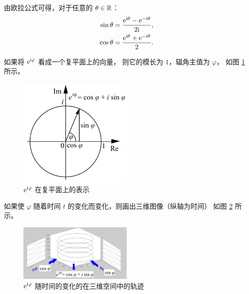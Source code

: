 \begin{corollary}
    由欧拉公式可得，对于任意的 $\theta \in \mathbb{R}$：
    \begin{align*}
        \sin \theta & = \frac{\mathrm{e}^{\mathrm{i}\theta} - \mathrm{e}^{-\mathrm{i}\theta}}{2\mathrm{i}}, \\
        \cos \theta & = \frac{\mathrm{e}^{\mathrm{i}\theta} + \mathrm{e}^{-\mathrm{i}\theta}}{2}.
    \end{align*}
\end{corollary}

\begin{example}[复值信号的图示]
    如果将 $\mathrm{e}^{\mathrm{i} \varphi}$ 看成一个复平面上的向量，
    则它的模长为 $1$，辐角主值为 $\varphi$，
    如图 \ref{fig:euler-formula-imaginary-plane} 所示。
    \begin{figure}[H]
        \centering
        \includegraphics[width=0.5\textwidth]{chap1/img/euler-formula-imaginary-plane.png}
        \caption{$\mathrm{e}^{\mathrm{i} \varphi}$ 在复平面上的表示}
        \label{fig:euler-formula-imaginary-plane}
    \end{figure}

    如果使 $\varphi$ 随着时间 $t$ 的变化而变化，则画出三维图像（纵轴为时间）
    如图 \ref{fig:euler-formula-imaginary-signals.png} 所示。
    \begin{figure}[H]
        \centering
        \includegraphics[width=0.5\textwidth]{chap1/img/euler-formula-imaginary-signals.png}
        \caption{$\mathrm{e}^{\mathrm{i} \varphi}$ 随时间的变化的在三维空间中的轨迹}
        \label{fig:euler-formula-imaginary-signals.png}
    \end{figure}
\end{example}

